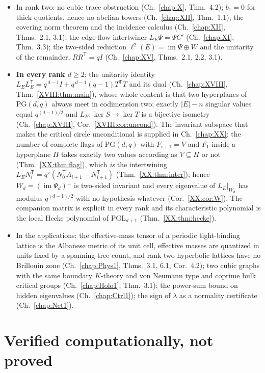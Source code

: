 \begin{itemize}
\item In rank two: no cubic trace obstruction (Ch.~\ref{chap:X}, Thm.~4.2); $b_1=0$ for
thick quotients, hence no abelian towers (Ch.~\ref{chap:XII}, Thm.~1.1); the covering
norm theorem and the incidence calculus (Ch.~\ref{chap:XII}, Thms.~2.1, 3.1); the
edge-flow intertwiner $L_E\Psi=\Psi C'$ (Ch.~\ref{chap:XI}, Thm.~3.3); the two-sided
reduction $\ell^2(E)=\operatorname{im}\Psi\oplus W$ and the unitarity of the remainder,
$RR^{\mathsf T}=qI$ (Ch.~\ref{chap:XV}, Thms.~2.1, 2.2, 3.1).
\item \textbf{In every rank $d\ge2$}: the unitarity identity
$L_EL_E^{\mathsf T}=q^{\,d-1}I+q^{\,d-1}(q-1)T^{\mathsf T}T$ and its dual
(Ch.~\ref{chap:XVIII}, Thm.~\ref{XVIII:thm:main}), whose whole content is that two
hyperplanes of $\mathrm{PG}(d,q)$ always meet in codimension two; exactly $|E|-n$ singular
values equal $q^{(d-1)/2}$ and $L_E:\ker S\to\ker T$ is a bijective isometry
(Ch.~\ref{chap:XVIII}, Cor.~\ref{XVIII:cor:uncond}). The invariant subspace that makes the
critical circle unconditional is supplied in Ch.~\ref{chap:XX}: the number of complete flags
of $\mathrm{PG}(d,q)$ with $F_{i+1}=V$ and $F_1$ inside a hyperplane $H$ takes exactly two
values according as $V\subseteq H$ or not (Thm.~\ref{XX:thm:flag}), which \emph{is} the
intertwining $L_EN_i^{\mathsf T}=q^{\,i}(N_0^{\mathsf T}A_{i+1}-N_{i+1}^{\mathsf T})$
(Thm.~\ref{XX:thm:inter}); hence $W_d=(\operatorname{im}\Psi_d)^\perp$ is two-sided
invariant and every eigenvalue of $L_E|_{W_d}$ has modulus $q^{(d-1)/2}$ with no hypothesis
whatever (Cor.~\ref{XX:cor:W}). The companion matrix is explicit in every rank and its
characteristic polynomial is the local Hecke polynomial of $\mathrm{PGL}_{d+1}$
(Thm.~\ref{XX:thm:hecke}).
\item In the applications: the effective-mass tensor of a periodic tight-binding lattice is
the Albanese metric of its unit cell, effective masses are quantized in units fixed by a
spanning-tree count, and rank-two hyperbolic lattices have no Brillouin zone
(Ch.~\ref{chap:Phys1}, Thms.~3.1, 6.1, Cor.~4.2); two cubic graphs with the same boundary
$K$-theory and von Neumann type and coprime bulk critical groups (Ch.~\ref{chap:Holo1},
Thm.~3.1); the power-sum bound on hidden eigenvalues (Ch.~\ref{chap:Ctrl1}); the sign of
$\lambda$ as a normality certificate (Ch.~\ref{chap:Net1}).
\end{itemize}

\section{Verified computationally, not proved}

